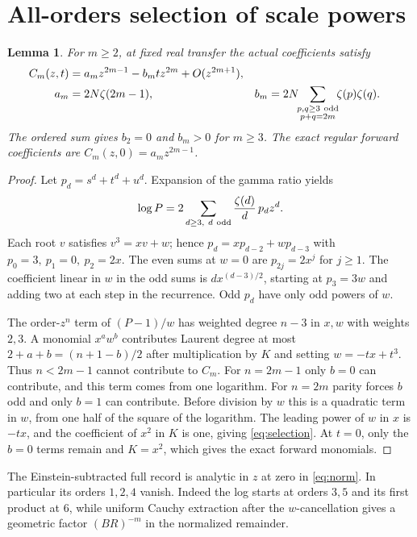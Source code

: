 \documentclass[11pt]{article}
\newtheorem{lemma}{Lemma}
\begin{document}
\section{All-orders selection of scale powers}
\begin{lemma}\label{lem:selection}
For \(m\ge2\), at fixed real transfer the actual coefficients satisfy
\begin{align}
 C_m(z,t)&=a_m z^{2m-1}-b_m t z^{2m}+O(z^{2m+1}),\label{eq:selection}\\
 a_m&=2N\zeta(2m-1),&
 b_m&=2N\!\!\sum_{\substack{p,q\ge3\ {\rm odd}\\p+q=2m}}\!\!\zeta(p)\zeta(q).
 \nonumber
\end{align}
The ordered sum gives \(b_2=0\) and \(b_m>0\) for \(m\ge3\). The exact regular forward coefficients are \(C_m(z,0)=a_m z^{2m-1}\).
\end{lemma}
\begin{proof}
Let \(p_d=s^d+t^d+u^d\). Expansion of the gamma ratio yields
\[
 \log P=2\sum_{d\ge3,\ d\ {\rm odd}}\frac{\zeta(d)}{d}\,p_d z^d .
\]
Each root \(v\) satisfies \(v^3=xv+w\); hence \(p_d=xp_{d-2}+wp_{d-3}\) with \(p_0=3,\ p_1=0,\ p_2=2x\). The even sums at \(w=0\) are \(p_{2j}=2x^j\) for \(j\ge1\). The coefficient linear in \(w\) in the odd sums is \(d x^{(d-3)/2}\), starting at \(p_3=3w\) and adding two at each step in the recurrence. Odd \(p_d\) have only odd powers of \(w\).

The order-\(z^n\) term of \((P-1)/w\) has weighted degree \(n-3\) in \(x,w\) with weights \(2,3\). A monomial \(x^a w^b\) contributes Laurent degree at most \(2+a+b=(n+1-b)/2\) after multiplication by \(K\) and setting \(w=-tx+t^3\). Thus \(n<2m-1\) cannot contribute to \(C_m\). For \(n=2m-1\) only \(b=0\) can contribute, and this term comes from one logarithm. For \(n=2m\) parity forces \(b\) odd and only \(b=1\) can contribute. Before division by \(w\) this is a quadratic term in \(w\), from one half of the square of the logarithm. The leading power of \(w\) in \(x\) is \(-tx\), and the coefficient of \(x^2\) in \(K\) is one, giving \eqref{eq:selection}. At \(t=0\), only the \(b=0\) terms remain and \(K=x^2\), which gives the exact forward monomials.
\end{proof}
The Einstein-subtracted full record is analytic in \(z\) at zero in \eqref{eq:norm}. In particular its orders \(1,2,4\) vanish. Indeed the log starts at orders \(3,5\) and its first product at \(6\), while uniform Cauchy extraction after the \(w\)-cancellation gives a geometric factor \((BR)^{-m}\) in the normalized remainder.
\end{document}
